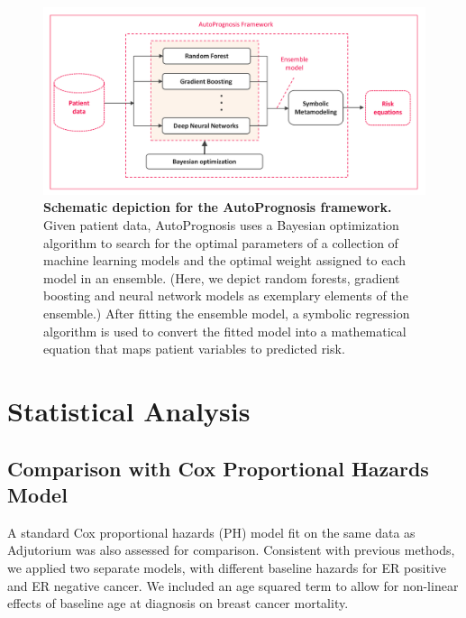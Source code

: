 \documentclass [PhD] {uclathes}
\begin{document}
\afterpage{\clearpage}
\begin{figure}
   \centering
   \includegraphics[width=8.75in]{ch8Fig2.pdf}
   \caption{{\bf Schematic depiction for the AutoPrognosis framework.} Given patient data, AutoPrognosis uses a Bayesian optimization algorithm to search for the optimal parameters of a collection of machine learning models and the optimal weight assigned to each model in an ensemble. (Here, we depict random forests, gradient boosting  and neural network models as exemplary elements of the ensemble.)  After fitting the ensemble model, a symbolic regression algorithm is used to convert the fitted model into a mathematical equation that maps patient variables to predicted risk.}
    \label{ch8fig2}
\end{figure}

\section{Statistical Analysis}
\label{ch8sec3}
\subsection*{Comparison with Cox Proportional Hazards Model}
A standard Cox proportional hazards (PH) model fit on the same data as Adjutorium was also assessed for comparison. Consistent with previous methods,\cite{dos2017updated} we applied two separate models, with different baseline hazards for ER positive and ER negative cancer. We included an age squared term to allow for non-linear effects of baseline age at diagnosis on breast cancer mortality.
\end{document}
